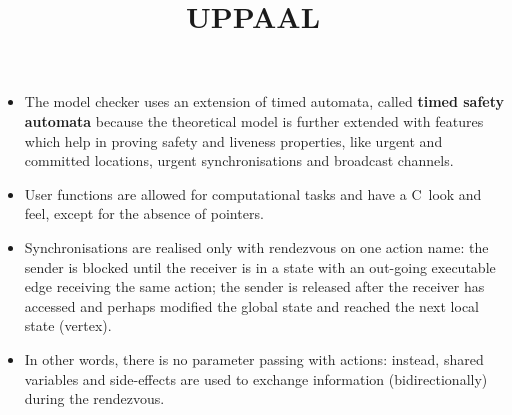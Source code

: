 \documentclass[wide]{slides}
\begin{document}
\begin{slide}
  \title{UPPAAL}

  \begin{itemize}

    \item The model checker \UPPAAL uses an extension of timed
      automata, called \textbf{timed safety automata} because the
      theoretical model is further extended with features which help
      in proving safety and liveness properties, like urgent and
      committed locations, urgent synchronisations and broadcast
      channels.

    \item User functions are allowed for computational tasks and have
      a \textsf{C}~look and feel, except for the absence of
      pointers.

    \item Synchronisations are realised only with rendezvous on one
      action name: the sender is blocked until the receiver is in a
      state with an out\hyp{}going executable edge receiving the same
      action; the sender is released after the receiver has accessed
      and perhaps modified the global state and reached the next local
      state (vertex).

    \item In other words, there is no parameter passing with actions:
      instead, shared variables and side\hyp{}effects are used to
      exchange information (bidirectionally) during the rendezvous.

  \end{itemize}

\end{slide}
\end{document}
